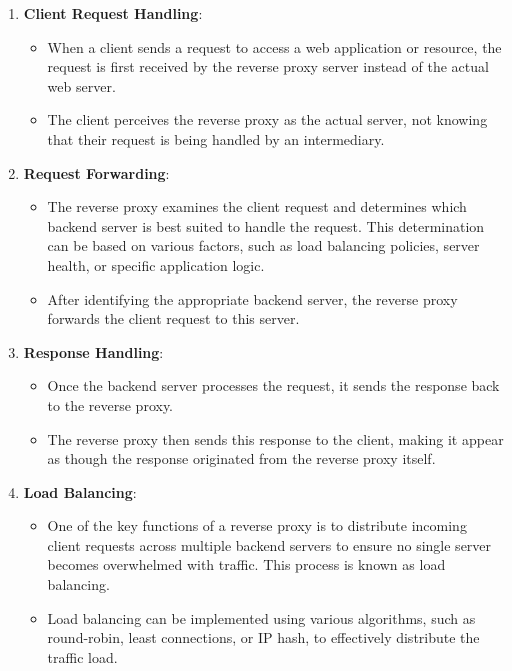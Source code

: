 \begin{enumerate}
    \item \textbf{Client Request Handling}:
    \begin{itemize}
        \item When a client sends a request to access a web application or resource, the request is first received by the reverse proxy server instead of the actual web server.
        \item The client perceives the reverse proxy as the actual server, not knowing that their request is being handled by an intermediary.
    \end{itemize}

    \item \textbf{Request Forwarding}:
    \begin{itemize}
        \item The reverse proxy examines the client request and determines which backend server is best suited to handle the request. This determination can be based on various factors, such as load balancing policies, server health, or specific application logic.
        \item After identifying the appropriate backend server, the reverse proxy forwards the client request to this server.
    \end{itemize}

    \item \textbf{Response Handling}:
    \begin{itemize}
        \item Once the backend server processes the request, it sends the response back to the reverse proxy.
        \item The reverse proxy then sends this response to the client, making it appear as though the response originated from the reverse proxy itself.
    \end{itemize}

    \item \textbf{Load Balancing}:
    \begin{itemize}
        \item One of the key functions of a reverse proxy is to distribute incoming client requests across multiple backend servers to ensure no single server becomes overwhelmed with traffic. This process is known as load balancing.
        \item Load balancing can be implemented using various algorithms, such as round-robin, least connections, or IP hash, to effectively distribute the traffic load.
    \end{itemize}


\end{enumerate}
